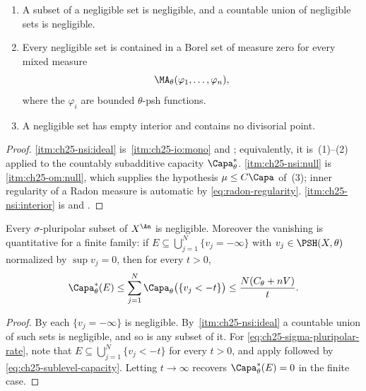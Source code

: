 \begin{proposition}
\label{prop:ch25-negligible-sigma-ideal}
\begin{enumerate}
\item\label{itm:ch25-nsi:ideal}
 A subset of a negligible set is negligible, and a countable union of
 negligible sets is negligible.
\item\label{itm:ch25-nsi:null}
 Every negligible set is contained in a Borel set of measure zero for every
 mixed measure
 \[
  \MA_\theta(\varphi_1,\ldots,\varphi_n),
 \]
 where the \(\varphi_i\) are bounded \(\theta\)-psh functions.
\item\label{itm:ch25-nsi:interior}
 A negligible set has empty interior and contains no divisorial point.
\end{enumerate}
\end{proposition}

\begin{proof}
\cref{itm:ch25-nsi:ideal} is
\,\cref{itm:ch25-io:mono} and
; equivalently, it is
\,(1)--(2) applied to the countably subadditive
capacity \(\Capa^*_\theta\).  \cref{itm:ch25-nsi:null} is
\,\cref{itm:ch25-om:null}, which supplies the
hypothesis \(\mu\leq C\Capa\) of \,(3);
inner regularity of a Radon measure is automatic by
\eqref{eq:radon-regularity}.  \cref{itm:ch25-nsi:interior} is
 and
.
\end{proof}

\begin{theorem}
\label{thm:ch25-pluripolar-negligible}
Every \(\sigma\)-pluripolar subset of \(X^{\An}\) is negligible.  Moreover
the vanishing is quantitative for a finite family: if
\(E\subseteq\bigcup_{j=1}^N\{v_j=-\infty\}\) with
\(v_j\in\PSH(X,\theta)\) normalized by \(\sup v_j=0\), then for every
\(t>0\),
\begin{equation}
\label{eq:ch25-sigma-pluripolar-rate}
 \Capa^*_\theta(E)\leq\sum_{j=1}^N
 \Capa_\theta\bigl(\{v_j<-t\}\bigr)
 \leq\frac{N(C_\theta+nV)}{t}.
\end{equation}
\end{theorem}

\begin{proof}
By  each \(\{v_j=-\infty\}\) is negligible.
By \,\cref{itm:ch25-nsi:ideal} a
countable union of such sets is negligible, and so is any subset of it.  For
\eqref{eq:ch25-sigma-pluripolar-rate}, note that
\(E\subseteq\bigcup_{j=1}^N\{v_j<-t\}\) for every \(t>0\), and apply
 followed by
\eqref{eq:ch25-sublevel-capacity}.  Letting \(t\to\infty\) recovers
\(\Capa^*_\theta(E)=0\) in the finite case.
\end{proof}

